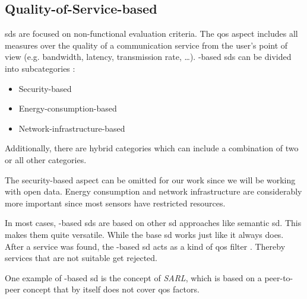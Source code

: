 \subsection{Quality-of-Service-based }\label{sec:qossd}

 \glspl{sd} are focused on non-functional evaluation criteria. The \gls{qos} aspect includes all measures over the quality of a communication service from the user's point of view (e.g. bandwidth, latency, transmission rate, \dots). -based \glspl{sd} can be divided into subcategories \autocite{Achir.2020.AtosdaiI}:

\begin{itemize}
\item Security-based
\item Energy-consumption-based
\item Network-infrastructure-based
\end{itemize}

Additionally, there are hybrid categories which can include a combination of two or all other categories.

The security-based aspect can be omitted for our work since we will be working with open data. Energy consumption and network infrastructure are considerably more important since most sensors have restricted resources.

In most cases, -based \glspl{sd} are based on other \gls{sd} approaches like semantic \gls{sd}. This makes them quite versatile. While the base \gls{sd} works just like it always does. After a service was found, the -based \gls{sd} acts as a kind of \gls{qos} filter \autocite{Kosunalp.2020.SArlbQaIsdm}. Thereby services that are not suitable get rejected.

One example of -based \gls{sd} is the concept of \emph{SARL}, which is based on a peer-to-peer concept that by itself does not cover \gls{qos} factors.
